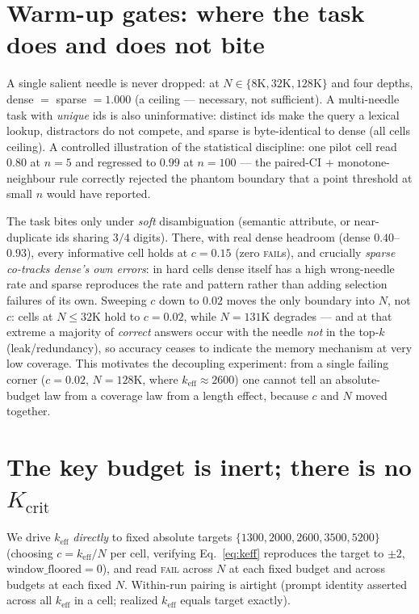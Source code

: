 \documentclass[11pt]{article}
\newcommand{\keff}{k_{\mathrm{eff}}}
\newcommand{\Kcrit}{K_{\mathrm{crit}}}
\begin{document}
\section{Warm-up gates: where the task does and does not bite}
\label{sec:warmup}

A single salient needle is never dropped: at $N\in\{8\mathrm{K},32\mathrm{K},
128\mathrm{K}\}$ and four depths, dense $=$ sparse $=1.000$ (a ceiling --- necessary,
not sufficient). A multi-needle task with \emph{unique} ids is also uninformative:
distinct ids make the query a lexical lookup, distractors do not compete, and sparse
is byte-identical to dense (all cells ceiling). A controlled illustration of the
statistical discipline: one pilot cell read $0.80$ at $n{=}5$ and regressed to
$0.99$ at $n{=}100$ --- the paired-CI + monotone-neighbour rule correctly rejected
the phantom boundary that a point threshold at small $n$ would have reported.

The task bites only under \emph{soft} disambiguation (semantic attribute, or
near-duplicate ids sharing $3/4$ digits). There, with real dense headroom
(dense $0.40$--$0.93$), every informative cell holds at $c{=}0.15$ (zero
\textsc{fail}s), and crucially \emph{sparse co-tracks dense's own errors}: in hard
cells dense itself has a high wrong-needle rate and sparse reproduces the rate and
pattern rather than adding selection failures of its own. Sweeping $c$ down to
$0.02$ moves the only boundary into $N$, not $c$: cells at $N\le 32\mathrm{K}$ hold
to $c{=}0.02$, while $N{=}131\mathrm{K}$ degrades --- and at that extreme a majority
of \emph{correct} answers occur with the needle \emph{not} in the top-$k$
(leak/redundancy), so accuracy ceases to indicate the memory mechanism at very low
coverage. This motivates the decoupling experiment: from a single failing corner
($c{=}0.02$, $N{=}128\mathrm{K}$, where $\keff{\approx}2600$) one cannot tell an
absolute-budget law from a coverage law from a length effect, because $c$ and $N$
moved together.

\section{The key budget is inert; there is no $\Kcrit$}
\label{sec:keff}

We drive $\keff$ \emph{directly} to fixed absolute targets
$\{1300,2000,2600,3500,5200\}$ (choosing $c=\keff/N$ per cell, verifying
Eq.~\ref{eq:keff} reproduces the target to $\pm 2$, $\text{window\_floored}=0$), and
read \textsc{fail} across $N$ at each fixed budget and across budgets at each fixed
$N$. Within-run pairing is airtight (prompt identity asserted across all $\keff$ in
a cell; realized $\keff$ equals target exactly).
\end{document}
